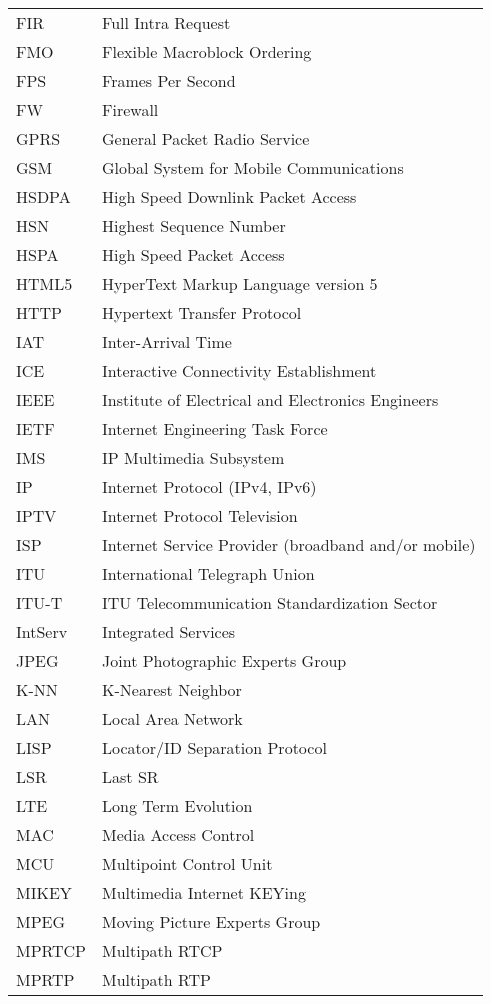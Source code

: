 \begin{longtable}{ll}
FIR 	& Full Intra Request \\
FMO 	& Flexible Macroblock Ordering \\
FPS 	& Frames Per Second \\
FW  	& Firewall \\
GPRS 	& General Packet Radio Service \\
GSM 	& Global System for Mobile Communications \\
HSDPA 	& High Speed Downlink Packet Access \\
HSN 	& Highest Sequence Number \\
HSPA 	& High Speed Packet Access \\
HTML5	& HyperText Markup Language version 5\\
HTTP 	& Hypertext Transfer Protocol \\
IAT  	& Inter-Arrival Time \\
ICE  	& Interactive Connectivity Establishment \\
IEEE 	& Institute of Electrical and Electronics Engineers \\
IETF	& Internet Engineering Task Force \\
IMS 	& IP Multimedia Subsystem \\
IP  	& Internet Protocol (IPv4, IPv6)\\
IPTV 	& Internet Protocol Television \\
ISP 	& Internet Service Provider (broadband and/or mobile) \\
ITU 	& International Telegraph Union \\
ITU-T 	& ITU Telecommunication Standardization Sector \\
IntServ	& Integrated Services \\
JPEG 	& Joint Photographic Experts Group \\
K-NN 	& K-Nearest Neighbor \\
LAN 	& Local Area Network \\
LISP 	& Locator/ID Separation Protocol\\
LSR 	& Last SR \\
LTE 	& Long Term Evolution \\
MAC 	& Media Access Control \\
MCU 	& Multipoint Control Unit \\
MIKEY	& Multimedia Internet KEYing \\
MPEG 	& Moving Picture Experts Group \\
MPRTCP	& Multipath RTCP \\
MPRTP 	& Multipath RTP \\

\end{longtable}
